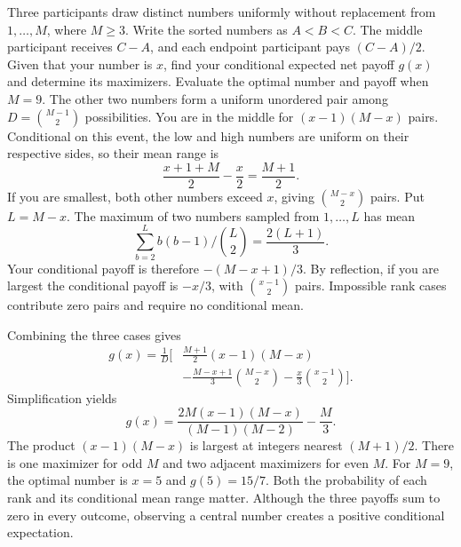 Three participants draw distinct numbers uniformly without replacement from $1,\ldots,M$, where $M\ge3$. Write the sorted numbers as $A<B<C$. The middle participant receives $C-A$, and each endpoint participant pays $(C-A)/2$. Given that your number is $x$, find your conditional expected net payoff $g(x)$ and determine its maximizers. Evaluate the optimal number and payoff when $M=9$.
\solution The other two numbers form a uniform unordered pair among $D=\binom{M-1}{2}$ possibilities. You are in the middle for $(x-1)(M-x)$ pairs. Conditional on this event, the low and high numbers are uniform on their respective sides, so their mean range is
\[
\frac{x+1+M}{2}-\frac x2=\frac{M+1}{2}.
\]
If you are smallest, both other numbers exceed $x$, giving $\binom{M-x}{2}$ pairs. Put $L=M-x$. The maximum of two numbers sampled from $1,\ldots,L$ has mean
\[
\sum_{b=2}^Lb(b-1)\big/\binom L2=\frac{2(L+1)}3.
\]
Your conditional payoff is therefore $-(M-x+1)/3$. By reflection, if you are largest the conditional payoff is $-x/3$, with $\binom{x-1}{2}$ pairs. Impossible rank cases contribute zero pairs and require no conditional mean.

Combining the three cases gives
\[
\begin{aligned}
g(x)=\frac1D\bigg[&\frac{M+1}{2}(x-1)(M-x)\\
&-\frac{M-x+1}{3}\binom{M-x}{2}
-\frac{x}{3}\binom{x-1}{2}\bigg].
\end{aligned}
\]
Simplification yields
\[
\boxed{g(x)=\frac{2M(x-1)(M-x)}{(M-1)(M-2)}-\frac M3.}
\]
The product $(x-1)(M-x)$ is largest at integers nearest $(M+1)/2$. There is one maximizer for odd $M$ and two adjacent maximizers for even $M$. For $M=9$, the optimal number is $x=5$ and $g(5)=15/7$.
\insight Both the probability of each rank and its conditional mean range matter. Although the three payoffs sum to zero in every outcome, observing a central number creates a positive conditional expectation.
